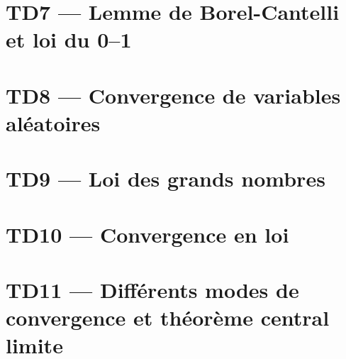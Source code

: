 \documentclass[french,a4paper,10pt]{article}
\begin{document}
    \newpage
    \section*{TD7 --- Lemme de Borel-Cantelli et loi du 0--1}\label{sec:TD7}
    \setcounter{section}{7}
    \setcounter{tdcounter}{0}
    

    \newpage
    \section*{TD8 --- Convergence de variables aléatoires}\label{sec:TD8}
    \setcounter{section}{8}
    \setcounter{tdcounter}{0}
    

    \newpage
    \section*{TD9 --- Loi des grands nombres}\label{sec:TD9}
    \setcounter{section}{9}
    \setcounter{tdcounter}{0}
    

    \newpage
    \section*{TD10 --- Convergence en loi}\label{sec:TD10}
    \setcounter{section}{10}
    \setcounter{tdcounter}{0}
    

    \newpage
    \section*{TD11 --- Différents modes de convergence et théorème central limite}\label{sec:TD11}
    \setcounter{section}{11}
    \setcounter{tdcounter}{0}
    

    
\end{document}
